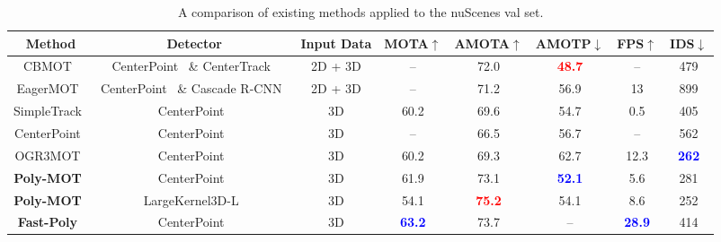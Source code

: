 \begin{table*}
\vspace{0.5em}
\begin{center}
\caption{
{A comparison of existing methods applied to the nuScenes val set.}}
\label{table:nu_val}
\setlength{\tabcolsep}{2.4mm}
{
\begin{tabular}{cccccccc}
\toprule
\bf{Method} & \bf{Detector} & \bf{Input Data} & \bf{MOTA$\uparrow$} & \bf{AMOTA$\uparrow$} & \bf{AMOTP$\downarrow$} & \bf{FPS$\uparrow$} & \bf{IDS$\downarrow$}  \\ \hline
CBMOT~\cite{benbarka2021score}   & CenterPoint~\cite{yin2021center} \& CenterTrack~\cite{zhou2020tracking} & 2D + 3D & -- & 72.0 & \textbf{\textcolor{red}{48.7}}  & -- & 479   \\
EagerMOT~\cite{kim2021eagermot}  & CenterPoint~\cite{yin2021center} \& Cascade R-CNN~\cite{cai2018cascade} & 2D + 3D  & -- & 71.2   & 56.9 & 13  & 899    \\
SimpleTrack~\cite{pang2022simpletrack}  & CenterPoint~\cite{yin2021center} & 3D & 60.2 & 69.6  & 54.7 & 0.5  & 405  \\
CenterPoint~\cite{yin2021center}   & CenterPoint~\cite{yin2021center} & 3D & -- & 66.5  & 56.7 & -- & 562 \\ 
OGR3MOT~\cite{zaech2022learnable}  & CenterPoint~\cite{yin2021center} &3D & 60.2 & 69.3  & 62.7 & 12.3 & \textbf{\textcolor{blue}{262}}  \\ \hline

\textbf{Poly-MOT}~\cite{li2023poly}      & CenterPoint~\cite{yin2021center} & 3D & 61.9 & 73.1   & \textbf{\textcolor{blue}{52.1}} & 5.6 & 281   \\ 

\textbf{Poly-MOT}~\cite{li2023poly}      & LargeKernel3D-L~\cite{chen2022scaling}  & 3D & 54.1 & \textbf{\textcolor{red}{75.2}}    & 54.1  & 8.6 & 252 \\

\textbf{Fast-Poly}~\cite{li2024fast}      & CenterPoint~\cite{yin2021center} & 3D & \textbf{\textcolor{blue}{63.2}}  & 73.7   &  -- & \textbf{\textcolor{blue}{28.9}} & 414   \\ \hline
 

\end{tabular}}
\end{center}
\end{table*}

